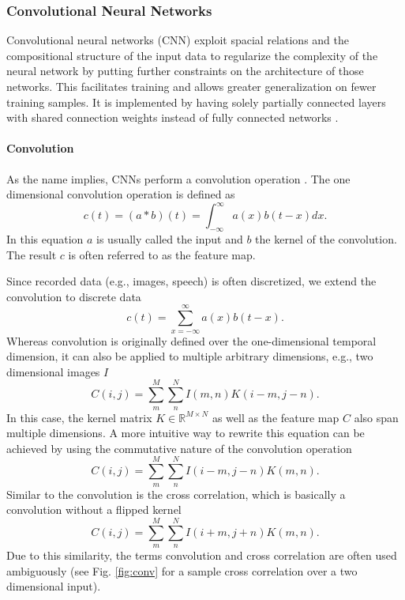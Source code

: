 \subsubsection{Convolutional Neural Networks} \label{c:cnns}

Convolutional neural networks (CNN) exploit spacial relations and the compositional structure of the input data to regularize the complexity of the neural network by putting further constraints on the architecture of those networks.
This facilitates training and allows greater generalization on fewer training samples.
It is implemented by having solely partially connected layers with shared connection weights instead of fully connected networks \cite{Goodfellow-et-al-2016-Book, lecun1989backpropagation}.    

\paragraph{Convolution} \label{c:convolution}

As the name implies, CNNs perform a convolution operation \cite{Goodfellow-et-al-2016-Book}. The one dimensional convolution operation is defined as
\[
c(t) = (a * b)(t) = \int_{- \infty}^{\infty} a(x)b(t-x) dx.
\]
In this equation $a$ is usually called the input and $b$ the kernel of the convolution. The result $c$ is often referred to as the feature map.

Since recorded data (e.g., images, speech) is often discretized, we extend the convolution to discrete data
\[
c(t) = \sum_{x = - \infty}^{\infty} a(x)b(t-x).
\]
Whereas convolution is originally defined over the one-dimensional temporal dimension, it can also be applied to multiple arbitrary dimensions, e.g., two dimensional images $I$
\[
C(i,j) = \sum_m^M \sum_n^N I(m,n) K(i - m, j -n).
\]
In this case, the kernel matrix $K \in \mathbb{R}^{M \times N} $ as well as the feature map $C$ also span multiple dimensions.
A more intuitive way to rewrite this equation can be achieved by using the commutative nature of the convolution operation
\[
C(i,j) = \sum_m^M \sum_n^N I(i - m,j - n) K(m, n).
\]
Similar to the convolution is the cross correlation, which is basically a convolution without a flipped kernel
\[
C(i,j) = \sum_m^M \sum_n^N I(i + m,j + n) K(m, n).
\]
Due to this similarity, the terms convolution and cross correlation are often used ambiguously (see Fig. \ref{fig:conv} for a sample cross correlation over a two dimensional input).

